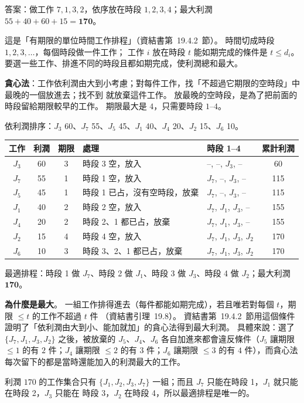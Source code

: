 \begin{pastsoln}
答案：做工作 $7, 1, 3, 2$，依序放在時段 $1, 2, 3, 4$；最大利潤 $55 + 40 + 60 + 15 = \mathbf{170}$。

這是「有期限的單位時間工作排程」（資結書第~19.4.2~節）。 時間切成時段 $1, 2, 3, \ldots$，每個時段做一件工作；
工作 $i$ 放在時段 $t$ 能如期完成的條件是 $t \le d_i$。 要選一些工作、排進不同的時段且都如期完成，使利潤總和最大。

\textbf{貪心法}：工作依利潤由大到小考慮；對每件工作，找「不超過它期限的空時段」中最晚的一個放進去；找不到
就放棄這件工作。 放最晚的空時段，是為了把前面的時段留給期限較早的工作。 期限最大是 $4$，只需要時段 $1$--$4$。

依利潤排序：$J_3$ 60、$J_7$ 55、$J_5$ 45、$J_1$ 40、$J_4$ 20、$J_2$ 15、$J_6$ 10。
\begin{center}
\small
\begin{tabular}{cccllc}
\toprule
工作 & 利潤 & 期限 & 處理 & 時段 1--4 & 累計利潤 \\
\midrule
$J_3$ & 60 & 3 & 時段 3 空，放入 & --, --, $J_3$, -- & 60 \\
$J_7$ & 55 & 1 & 時段 1 空，放入 & $J_7$, --, $J_3$, -- & 115 \\
$J_5$ & 45 & 1 & 時段 1 已占，沒有空時段，放棄 & $J_7$, --, $J_3$, -- & 115 \\
$J_1$ & 40 & 2 & 時段 2 空，放入 & $J_7$, $J_1$, $J_3$, -- & 155 \\
$J_4$ & 20 & 2 & 時段 2、1 都已占，放棄 & $J_7$, $J_1$, $J_3$, -- & 155 \\
$J_2$ & 15 & 4 & 時段 4 空，放入 & $J_7$, $J_1$, $J_3$, $J_2$ & 170 \\
$J_6$ & 10 & 3 & 時段 3、2、1 都已占，放棄 & $J_7$, $J_1$, $J_3$, $J_2$ & 170 \\
\bottomrule
\end{tabular}
\end{center}
最適排程：時段 1 做 $J_7$、時段 2 做 $J_1$、時段 3 做 $J_3$、時段 4 做 $J_2$；最大利潤 $\mathbf{170}$。

\textbf{為什麼是最大}。 一組工作排得進去（每件都能如期完成），若且唯若對每個 $t$，期限 $\le t$ 的工作不超過 $t$ 件
（資結書引理~19.8）。 資結書第~19.4.2~節用這個條件證明了「依利潤由大到小、能加就加」的貪心法得到最大利潤。 具體來說：選了 $\{J_7, J_1, J_3, J_2\}$
之後，被放棄的 $J_5$、$J_4$、$J_6$ 各自加進來都會違反條件（$J_5$ 讓期限 $\le 1$ 的有 $2$ 件；$J_4$ 讓期限 $\le 2$ 的有
$3$ 件；$J_6$ 讓期限 $\le 3$ 的有 $4$ 件），而貪心法每次留下的都是當時還能加入的利潤最大的工作。

利潤 $170$ 的工作集合只有 $\{J_1, J_2, J_3, J_7\}$ 一組；而且 $J_7$ 只能在時段 1，$J_1$ 就只能在時段 2，$J_3$ 只能在
時段 3，$J_2$ 在時段 4，所以最適排程是唯一的。
\end{pastsoln}

